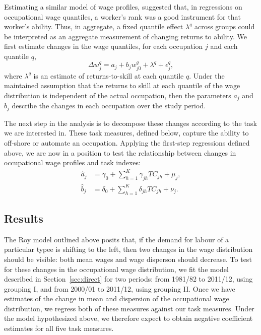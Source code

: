 Estimating a similar model of wage profiles, \citet{Juhn1993} suggested that, in regressions on occupational wage quantiles, a worker's rank was a good instrument for that worker's ability. Thus, in aggregate, a fixed quantile effect $\lambda^q$ across groups could be interpreted as an aggregate measurement of changing returns to ability. We first estimate changes in the wage quantiles, for each occupation $j$ and each quantile $q$,
\begin{equation} 
  \Delta w_j^q = a_j + b_jw_{j0}^q + \lambda^q + \epsilon^q_j, \label{eq:quantiles}
\end{equation}
where $\lambda^q$ is an estimate of returns-to-skill at each quantile $q$. Under the maintained assumption that the returns to skill at each quantile of the wage distribution is independent of the actual occupation, then the parameters $a_j$ and $b_j$ describe the changes in each occupation over the study period.

The next step in the analysis is to decompose these changes according to the task we are interested in. These task measures, defined below, capture the ability to off-shore or automate an occupation. Applying the first-step regressions defined above, we are now in a position to test the relationship between changes in occupational wage profiles and task indexes:
\begin{align}
  \hat{a}_j &= \gamma_0 + \sum_{h=1}^K\gamma_{jh}TC_{jh} + \mu_j, \label{eq:aeq} \\
  \hat{b}_j &= \delta_0 + \sum_{h=1}^K\delta_{jh}TC_{jh} + \nu_j. \label{eq:beq}
\end{align}

\subsection{Results}

The Roy model outlined above posits that, if the demand for labour of a particular typee is shifting to the left, then two changes in the wage distribution should be visible: both mean wages and wage disperson should decrease. To test for these changes in the occupational wage distribution, we fit the model described in Section~\ref{sec:direct} for two periods: from 1981/82 to 2011/12, using grouping I, and from 2000/01 to 2011/12, using grouping II. Once we have estimates of the change in mean and dispersion of the occupational wage distribution, we regress both of these measures against our task measures. Under the model hypothesized above, we therefore expect to obtain negative coefficient estimates for all five task measures.

